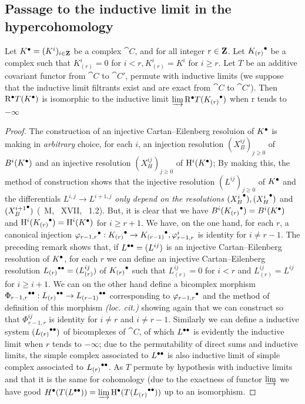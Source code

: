 \subsection{Passage to the inductive limit in the hypercohomology}
\label{subsection:0.11.5}
\begin{lemma}[11.5.1]
\label{0.11.5.1}
Let ${K}^{\bullet} = (K^i)_{i\in \mathbf{Z}}$ be a complex $\cat{C}$, and for all integer $r\in \mathbf{Z}$.
Let ${K_{(r)}}^{\bullet}$ be a complex such that $K_{(r)}^i = 0$ for $i<r, K_{(r)}^i = K^i$ for $i\geq r$.
Let $T$ be an additive covariant functor from $\cat{C}$ to $\cat{C'}$, permute with inductive limits 
(we suppose that the inductive limit filtrants exist and are exact from $\cat{C}$ to $\cat{C'}$).
Then ${\mathrm{R}}^{\bullet}T({K}^{\bullet})$ is isomorphic to the inductive limit $\varinjlim {\mathrm{R}}^{\bullet} T({K_{(r)}}^{\bullet})$ when r tends to $-\infty$
\end{lemma}
\begin{proof}
The construction of an injective Cartan--Eilenberg resoluion of ${K}^{\bullet}$ is making in \emph{arbitrary} choice, for each $i$, 
an injection resolution $(X_{B}^{ij})_{j\geq 0}$ of $B^i({K}^{\bullet})$ and an injective resolution $(X_{H}^{ij})_{j\geq 0}$ of $\mathrm{H}^i({K}^{\bullet})$; 
By making this, the method of construction shows that the injective resolution $(L^{ij})_{j\geq 0}$ of ${K}^{\bullet}$ and 
the differentials $L^{i,j} \rightarrow L^{i+1, j}$ \emph{only depend on the resolutions} $({X_B^i}^{\bullet}), ({X_H^i}^{\bullet})$ and $({X_B^{i+1}}^{\bullet})$ (~M, ~XVII, ~1.2).
But, it is clear that we have $B^i({K_{(r)}}^{\bullet}) = B^i({K}^{\bullet})$ and $\mathrm{H}^i({K_{(r)}}^{\bullet}) = \mathrm{H}^i({K}^{\bullet})$ for $i\geq r+1$.
We have, on the one hand, for each $r$, a canonical injection ${\varphi_{r-1, r}}^{\bullet}: {K_{(r)}}^{\bullet} \rightarrow {K_{(r-1)}}^{\bullet}, \varphi_{r-1, r}^i$ is identity for $i\neq r-1$. 
The preceding remark shows that, if ${L}^{\bullet\bullet} = (L^{ij})$ is an injective Cartan--Eilenberg resolution of ${K}^{\bullet}$,
for each $r$ we can define an injective Cartan--Eilenberg resolution ${L_{(r)}}^{\bullet\bullet} = (L_{(r)}^{ij})$ of ${K_{(r)}}^{\bullet}$ such that $L_{(r)}^{ij} = 0$ for $i<r$ and $L_{(r)}^{ij} = L^{ij}$ for $i\geq i+1$.
We can on the other hand define a bicomplex morphism ${\Phi_{r-1, r}}^{\bullet\bullet}: {L_{(r)}}^{\bullet\bullet} \rightarrow {L_{(r-1)}}^{\bullet\bullet}$ corresponding to ${\varphi_{r-1, r}}^{\bullet}$ and 
the method of definition of this morphism \emph{(loc. cit.)} showing again that we can construct so that $\Phi_{r-1, r}^{ij}$ is identity for $i\neq r$ and $i\neq r-1$.
Similarly we can define a inductive system $({L_{(r)}}^{\bullet\bullet})$ of bicomplexes of $\cat{C}$, 
of which ${L}^{\bullet\bullet}$ is evidently the inductive limit when $r$ tends to $-\infty$; 
due to the permutability of direct sums and inductive limits, the simple complex associated to ${L}^{\bullet\bullet}$ is also inductive limit of simple complex associated to ${L_{(r)}}^{\bullet\bullet}$.
As $T$ permute by hypothesis with inductive limits and that it is the same for cohomology 
(due to the exactness of functor $\varinjlim$ we have good ${H}^{\bullet}(T({L}^{\bullet\bullet})) = \varinjlim{\mathrm{H}}^{\bullet}(T({L_{(r)}}^{\bullet\bullet}))$ up to an isomorphism.
\end{proof}


